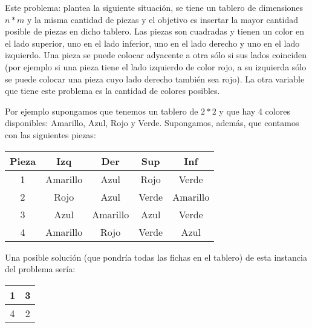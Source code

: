 Este problema: plantea la siguiente situación, se tiene un tablero de dimensiones $n*m$ y la misma cantidad de piezas y el objetivo es insertar la mayor cantidad posible de piezas en dicho tablero. Las piezas son cuadradas y tienen un color en el lado superior, uno en el lado inferior, uno en el lado derecho y uno en el lado izquierdo. Una pieza se puede colocar adyacente a otra sólo si sus lados coinciden (por ejemplo si una pieza tiene el lado izquierdo de color rojo, a su izquierda sólo se puede colocar una pieza cuyo lado derecho también sea rojo). La otra variable que tiene este problema es la cantidad de colores posibles.

Por ejemplo supongamos que tenemos un tablero de $2*2$ y que hay 4 colores disponibles: Amarillo, Azul, Rojo y Verde. Supongamos, además, que contamos con las siguientes piezas:
\begin{center}
\begin{tabular}{c|c|c|c|c}
 Pieza & Izq & Der & Sup & Inf \\
 \hline
 1 & Amarillo & Azul & Rojo & Verde \\
 2 & Rojo & Azul & Verde & Amarillo \\
 3 & Azul & Amarillo & Azul & Verde \\
 4 & Amarillo & Rojo & Verde & Azul \\
\end{tabular}
\end{center}

Una posible solución (que pondría todas las fichas en el tablero) de esta instancia del problema sería:
\begin{center}
\begin{tabular}{|c|c|}
  \hline
  1 & 3 \\
  \hline
  4 & 2 \\
  \hline  
\end{tabular}
\end{center}
